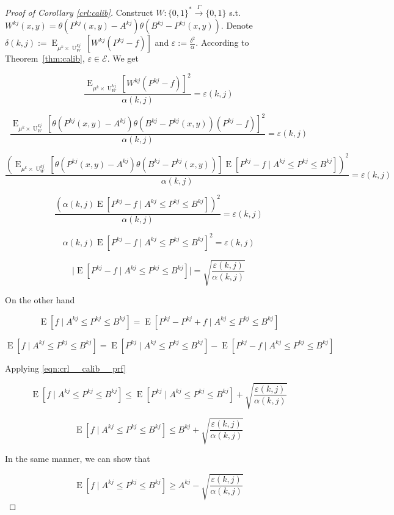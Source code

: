 \documentclass{article}
\numberwithin{equation}{section}
\theoremstyle{definition}
\theoremstyle{plain}
\newcommand{\Bool}{\{0,1\}}
\newcommand{\Words}{{\Bool^*}}
\DeclareMathOperator{\E}{E}
\DeclareMathOperator{\U}{U}
\newcommand{\Abs}[1]{\lvert #1 \rvert}
\newcommand{\Fall}{\mathcal{E}}
\newcommand{\Scheme}{\xrightarrow{\Gamma}}
\begin{document}
\begin{proof}[Proof of Corollary \ref{crl:calib}]

Construct $W: \Words \Scheme \Bool$ s.t. ${W^{kj}(x,y)=\theta(P^{kj}(x,y)-A^{kj})\theta(B^{kj}-P^{kj}(x,y))}$. Denote $\delta(k,j):=\E_{\mu^k \times \U_W^{kj}}[W^{kj}(P^{kj}-f)]$ and $\varepsilon:=\frac{\delta^2}{\alpha}$. According to Theorem~\ref{thm:calib}, $\varepsilon \in \Fall$.
We get

$$\frac{\E_{\mu^k \times \U_W^{kj}}[W^{kj}(P^{kj}-f)]^2}{\alpha(k,j)} = \varepsilon(k,j)$$

$$\frac{\E_{\mu^k \times \U_W^{kj}}[\theta(P^{kj}(x,y)-A^{kj})\theta(B^{kj}-P^{kj}(x,y))(P^{kj}-f)]^2}{\alpha(k,j)} = \varepsilon(k,j)$$

$$\frac{(\E_{\mu^k \times \U_W^{kj}}[\theta(P^{kj}(x,y)-A^{kj})\theta(B^{kj}-P^{kj}(x,y))]\E[P^{kj}-f \mid A^{kj} \leq P^{kj} \leq B^{kj}])^2}{\alpha(k,j)} = \varepsilon(k,j)$$

$$\frac{(\alpha(k,j)\E[P^{kj}-f \mid A^{kj} \leq P^{kj} \leq B^{kj}])^2}{\alpha(k,j)} = \varepsilon(k,j)$$

$$\alpha(k,j)\E[P^{kj}-f \mid A^{kj} \leq P^{kj} \leq B^{kj}]^2 = \varepsilon(k,j)$$

\begin{equation}
\label{eqn:crl__calib__prf}
\Abs{\E[P^{kj}-f \mid A^{kj} \leq P^{kj} \leq B^{kj}]} = \sqrt{\frac{\varepsilon(k,j)}{\alpha(k,j)}}
\end{equation}

On the other hand

$$\E[f \mid A^{kj} \leq P^{kj} \leq B^{kj}] = \E[P^{kj}-P^{kj}+f \mid A^{kj} \leq P^{kj} \leq B^{kj}]$$

$$\E[f \mid A^{kj} \leq P^{kj} \leq B^{kj}] = \E[P^{kj} \mid A^{kj} \leq P^{kj} \leq B^{kj}]-\E[P^{kj}-f \mid A^{kj} \leq P^{kj} \leq B^{kj}]$$

Applying \ref{eqn:crl__calib__prf}

$$\E[f \mid A^{kj} \leq P^{kj} \leq B^{kj}] \leq \E[P^{kj} \mid A^{kj} \leq P^{kj} \leq B^{kj}]+\sqrt{\frac{\varepsilon(k,j)}{\alpha(k,j)}}$$


$$\E[f \mid A^{kj} \leq P^{kj} \leq B^{kj}] \leq B^{kj} + \sqrt{\frac{\varepsilon(k,j)}{\alpha(k,j)}}$$

In the same manner, we can show that

$$\E[f \mid A^{kj} \leq P^{kj} \leq B^{kj}] \geq A^{kj} - \sqrt{\frac{\varepsilon(k,j)}{\alpha(k,j)}}$$

\end{proof}
\end{document}
